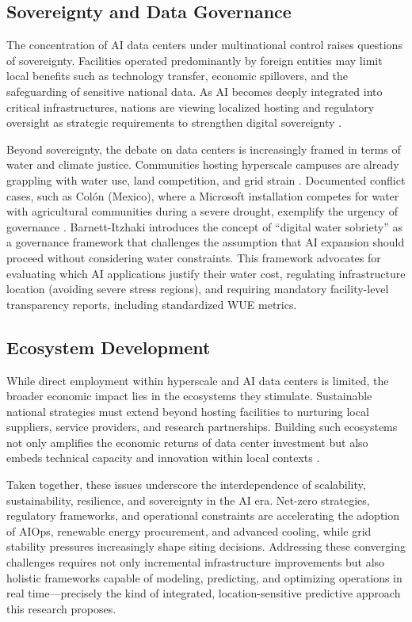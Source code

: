 \documentclass[conference]{IEEEtran}
\begin{document}
\subsection{Sovereignty and Data Governance}

The concentration of AI data centers under multinational control raises questions of sovereignty. Facilities operated predominantly by foreign entities may limit local benefits such as technology transfer, economic spillovers, and the safeguarding of sensitive national data. As AI becomes deeply integrated into critical infrastructures, nations are viewing localized hosting and regulatory oversight as strategic requirements to strengthen digital sovereignty \cite{Zakarya2024}.

Beyond sovereignty, the debate on data centers is increasingly framed in terms of water and climate justice. Communities hosting hyperscale campuses are already grappling with water use, land competition, and grid strain \cite{Guidi2024}. Documented conflict cases, such as Colón (Mexico), where a Microsoft installation competes for water with agricultural communities during a severe drought, exemplify the urgency of governance \cite{Barnett2026}. Barnett-Itzhaki \cite{Barnett2026} introduces the concept of ``digital water sobriety'' as a governance framework that challenges the assumption that AI expansion should proceed without considering water constraints. This framework advocates for evaluating which AI applications justify their water cost, regulating infrastructure location (avoiding severe stress regions), and requiring mandatory facility-level transparency reports, including standardized WUE metrics.

\subsection{Ecosystem Development}

While direct employment within hyperscale and AI data centers is limited, the broader economic impact lies in the ecosystems they stimulate. Sustainable national strategies must extend beyond hosting facilities to nurturing local suppliers, service providers, and research partnerships. Building such ecosystems not only amplifies the economic returns of data center investment but also embeds technical capacity and innovation within local contexts \cite{Zakarya2024}.

Taken together, these issues underscore the interdependence of scalability, sustainability, resilience, and sovereignty in the AI era. Net-zero strategies, regulatory frameworks, and operational constraints are accelerating the adoption of AIOps, renewable energy procurement, and advanced cooling, while grid stability pressures increasingly shape siting decisions. Addressing these converging challenges requires not only incremental infrastructure improvements but also holistic frameworks capable of modeling, predicting, and optimizing operations in real time---precisely the kind of integrated, location-sensitive predictive approach this research proposes.
\end{document}
